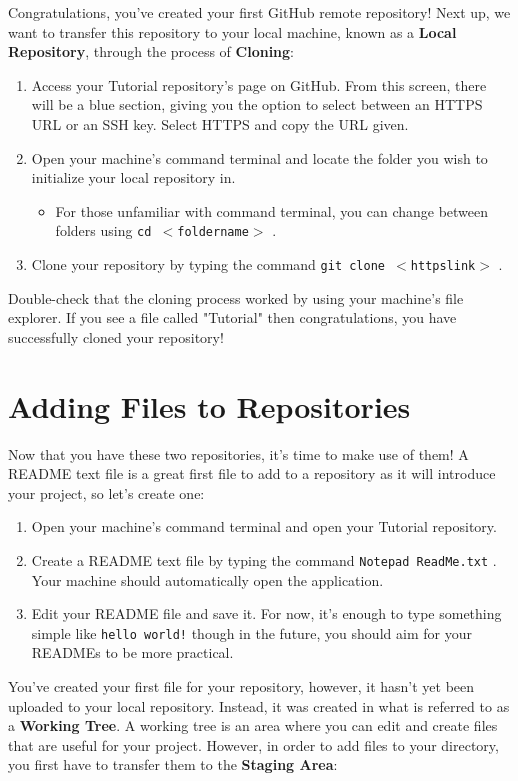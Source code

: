 \documentclass[10pt]{article}
\begin{document}
Congratulations, you've created your first GitHub remote repository! Next up, we want to transfer this repository to your local machine, known as a \textbf{Local Repository}, through the process of \textbf{Cloning}:

\begin{enumerate}
\item Access your Tutorial repository's page on GitHub. From this screen, there will be a blue section, giving you the option to select between an HTTPS URL or an SSH key. Select HTTPS and copy the URL given. 
\item Open your machine's command terminal and locate the folder you wish to initialize your local repository in.
	\begin{itemize}
	\item For those unfamiliar with command terminal, you can change between folders using  \texttt{cd $<$foldername$>$} .
	\end{itemize}
\item  Clone your repository by typing the command  \texttt{git clone $<$httpslink$>$} .
\end{enumerate}

Double-check that the cloning process worked by using your machine's file explorer. If you see a file called "Tutorial" then congratulations, you have successfully cloned your repository!

\section{Adding Files to Repositories}
Now that you have these two repositories, it's time to make use of them! A README text file is a great first file to add to a repository as it will introduce your project, so let's create one:
 
\begin{enumerate}
\item Open your machine's command terminal and open your Tutorial repository.
\item Create a README text file by typing the command \texttt{Notepad ReadMe.txt} . Your machine should automatically open the application.
\item Edit your README file and save it. For now, it's enough to type something simple like \texttt{hello world!} though in the future, you should aim for your READMEs to be more practical.
\end{enumerate}

You've created your first file for your repository, however, it hasn't yet been uploaded to your local repository. Instead, it was created in what is referred to as a \textbf{Working Tree}. A working tree is an area where you can edit and create files that are useful for your project. However, in order to add files to your directory, you first have to transfer them to the \textbf{Staging Area}: 
\end{document}
